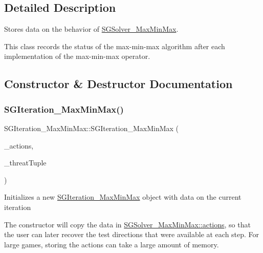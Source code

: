 \subsection{Detailed Description}
Stores data on the behavior of \hyperlink{classSGSolver__MaxMinMax}{S\+G\+Solver\+\_\+\+Max\+Min\+Max}. 

This class records the status of the max-\/min-\/max algorithm after each implementation of the max-\/min-\/max operator. 

\subsection{Constructor \& Destructor Documentation}
\mbox{\label{classSGIteration__MaxMinMax_ab30ded06cb025b502da9f9b2354f9e05}} 
\subsubsection{\texorpdfstring{S\+G\+Iteration\+\_\+\+Max\+Min\+Max()}{SGIteration\_MaxMinMax()}}
{\footnotesize\ttfamily S\+G\+Iteration\+\_\+\+Max\+Min\+Max\+::\+S\+G\+Iteration\+\_\+\+Max\+Min\+Max (\begin{DoxyParamCaption}\item[{const vector$<$ list$<$ \hyperlink{classSGAction__MaxMinMax}{S\+G\+Action\+\_\+\+Max\+Min\+Max} $>$ $>$ \&}]{\+\_\+actions,  }\item[{const \hyperlink{classSGTuple}{S\+G\+Tuple} \&}]{\+\_\+threat\+Tuple }\end{DoxyParamCaption})\hspace{0.3cm}{\ttfamily [inline]}}

Initializes a new \hyperlink{classSGIteration__MaxMinMax}{S\+G\+Iteration\+\_\+\+Max\+Min\+Max} object with data on the current iteration

The constructor will copy the data in \hyperlink{classSGSolver__MaxMinMax_ad1a4bf22aaa58dd05c7bc7a24d9c1805}{S\+G\+Solver\+\_\+\+Max\+Min\+Max\+::actions}, so that the user can later recover the test directions that were available at each step. For large games, storing the actions can take a large amount of memory. 

